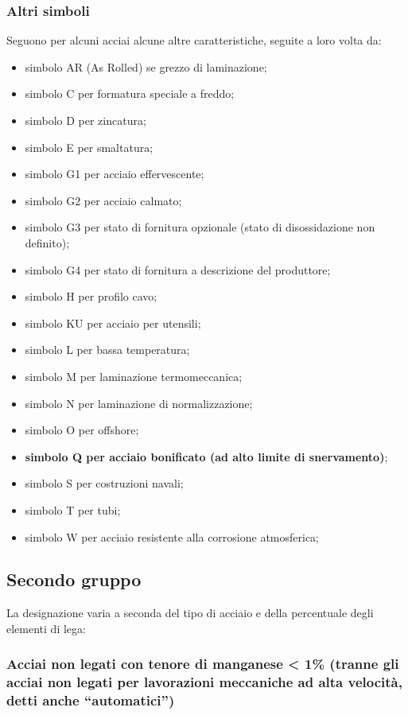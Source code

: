\subsubsection{Altri simboli}
Seguono per alcuni acciai alcune altre caratteristiche, seguite a loro volta da:
\begin{itemize}
    \item simbolo AR (As Rolled) se grezzo di laminazione;
 \item simbolo C per formatura speciale a freddo;
 \item simbolo D per zincatura;
 \item simbolo E per smaltatura;
 \item simbolo G1 per acciaio effervescente;
 \item simbolo G2 per acciaio calmato;
 \item simbolo G3 per stato di fornitura opzionale (stato di disossidazione non definito);
 \item simbolo G4 per stato di fornitura a descrizione del produttore;
 \item simbolo H per profilo cavo;
 \item simbolo KU per acciaio per utensili;
 \item simbolo L per bassa temperatura;
\item simbolo M per laminazione termomeccanica;
 \item simbolo N per laminazione di normalizzazione;
 \item simbolo O per offshore;
 \item \textbf{simbolo Q per acciaio bonificato (ad alto limite di snervamento)};
 \item simbolo S per costruzioni navali;
 \item simbolo T per tubi;
\item simbolo W per acciaio resistente alla corrosione atmosferica;
\end{itemize}

\subsection{Secondo gruppo}
La designazione varia a seconda del tipo di acciaio e della percentuale degli elementi di lega:

\subsubsection{Acciai non legati con tenore di manganese < 1\% (tranne gli acciai non legati per lavorazioni meccaniche ad alta velocità, detti anche “automatici”)}

